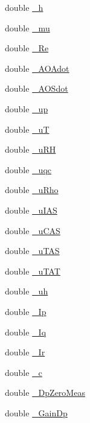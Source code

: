 \begin{DoxyCompactItemize}
double \hyperlink{class_air_d_c_a66fa186559440d1b4ae7a1d03bc1d6a5}{\+\_\+h}
\item 
double \hyperlink{class_air_d_c_a20551125b780e1ece94dd41a896c23e3}{\+\_\+mu}
\item 
double \hyperlink{class_air_d_c_ab3ab74af3a00dea2bcd0bab893b43eff}{\+\_\+\+Re}
\item 
double \hyperlink{class_air_d_c_a70fe35edba2791df773ca1a8d7443d2b}{\+\_\+\+A\+O\+Adot}
\item 
double \hyperlink{class_air_d_c_abd2d478d783886d15f87b99534fcaf62}{\+\_\+\+A\+O\+Sdot}
\item 
double \hyperlink{class_air_d_c_ab4b9f099c8aa4f062f6dec55e3df1283}{\+\_\+up}
\item 
double \hyperlink{class_air_d_c_a86f3d5b690a3b2ad95c7ec123f26cce6}{\+\_\+uT}
\item 
double \hyperlink{class_air_d_c_acf688ff55f29ba54c9597488892e5585}{\+\_\+u\+RH}
\item 
double \hyperlink{class_air_d_c_af57ba8f485f319af287418ce742b967c}{\+\_\+uqc}
\item 
double \hyperlink{class_air_d_c_aab669ac6d052f01d5dc9f345337d9e17}{\+\_\+u\+Rho}
\item 
double \hyperlink{class_air_d_c_a0ac29415592cc16e4b65df63d63e0c6d}{\+\_\+u\+I\+AS}
\item 
double \hyperlink{class_air_d_c_ad03e64d89fbbaf384742a78a9c8f3656}{\+\_\+u\+C\+AS}
\item 
double \hyperlink{class_air_d_c_acddb83fb7c5062242da92d1d84f45766}{\+\_\+u\+T\+AS}
\item 
double \hyperlink{class_air_d_c_ac872626f05fed673e71d599659dcd06b}{\+\_\+u\+T\+AT}
\item 
double \hyperlink{class_air_d_c_abbd58e546b9543b16efb338da5104c93}{\+\_\+uh}
\item 
double \hyperlink{class_air_d_c_ab9056d28bd322cca2c54667e9c19fda1}{\+\_\+\+Ip}
\item 
double \hyperlink{class_air_d_c_aeb849e008f547a98ee321899dc36f1fd}{\+\_\+\+Iq}
\item 
double \hyperlink{class_air_d_c_ade7fb03c0a98ea25741c3abc9ec2a3bd}{\+\_\+\+Ir}
\item 
double \hyperlink{class_air_d_c_a22989053a777ff145d35e5022f485668}{\+\_\+c}
\item 
double \hyperlink{class_air_d_c_a5bef6873f02bb7ef89da730e2ce25126}{\+\_\+\+Dp\+Zero\+Meas}
\item 
double \hyperlink{class_air_d_c_aea00f62b7477ab0270c88b04205b8212}{\+\_\+\+Gain\+Dp}
\end{DoxyCompactItemize}


